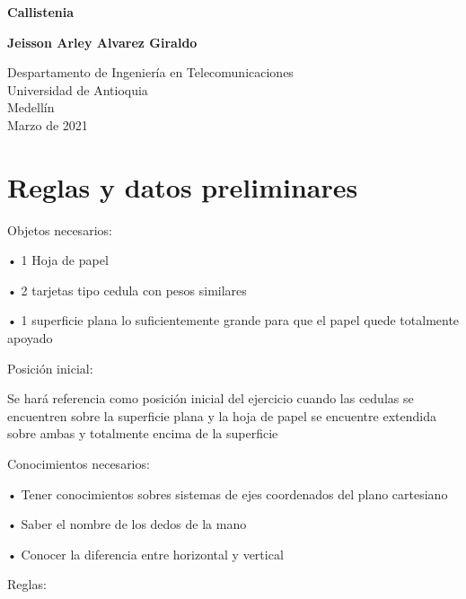 \documentclass{article}
\begin{document}
\begin{titlepage}
    \begin{center}
        \vspace*{1cm}
            
        \Huge
        \textbf{Callistenia}
            
        \vspace{0.5cm}
        \LARGE
        
            
        \vspace{1.5cm}
            
        \textbf{Jeisson Arley Alvarez Giraldo}
            
        \vfill
            
        \vspace{0.8cm}
            
        \Large
        Despartamento de Ingeniería en Telecomunicaciones\\
        Universidad de Antioquia\\
        Medellín\\
        Marzo de 2021
            
    \end{center}
\end{titlepage}

\tableofcontents
\newpage
\section{Reglas y datos preliminares}\label{intro}
Objetos necesarios:

•	1 Hoja de papel

•	2 tarjetas tipo cedula con pesos similares

•	1 superficie plana lo suficientemente grande para que el papel quede totalmente apoyado


Posición inicial:

Se hará referencia como posición inicial del ejercicio cuando las cedulas se encuentren sobre la superficie plana y la hoja de papel se encuentre extendida sobre ambas y totalmente encima de la superficie


Conocimientos necesarios:

•	Tener conocimientos sobres sistemas de ejes coordenados del plano cartesiano

•	Saber el nombre de los dedos de la mano

•	Conocer la diferencia entre horizontal y vertical


Reglas:
\end{document}
